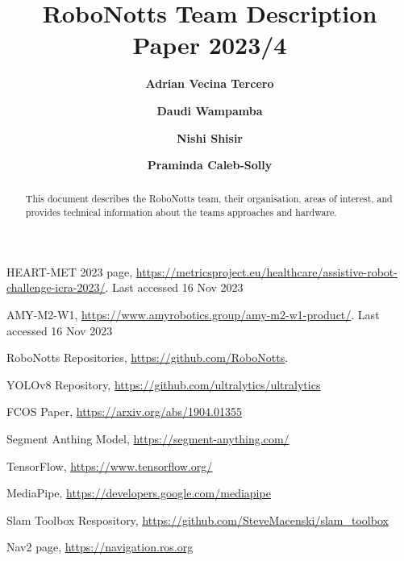 \documentclass[runningheads]{llncs}
\begin{document}
%
\title{RoboNotts Team Description Paper 2023/4}
%
%
\author{\textbf{Adrian Vecina Tercero}\and
\textbf{Daudi Wampamba}\and \textbf{Nishi Shisir} \and
\textbf{Praminda Caleb-Solly}}


%
%
%
\maketitle              %
%
\begin{abstract}
This document describes the RoboNotts team, their organisation, areas of interest, and provides technical information about the teams approaches and hardware.  
\end{abstract}
%
%
%




%
%
%
% 
% 
%
\begin{thebibliography}{8}

HEART-MET 2023 page, \url{https://metricsproject.eu/healthcare/assistive-robot-challenge-icra-2023/}. Last accessed 16
Nov 2023

AMY-M2-W1, \url{https://www.amyrobotics.group/amy-m2-w1-product/}. Last accessed 16
Nov 2023

RoboNotts Repositories, \url{https://github.com/RoboNotts}.

YOLOv8 Repository, \url{https://github.com/ultralytics/ultralytics}

FCOS Paper, \url{https://arxiv.org/abs/1904.01355}

Segment Anthing Model, \url{https://segment-anything.com/}

TensorFlow, \url{https://www.tensorflow.org/}

MediaPipe, \url{https://developers.google.com/mediapipe}

Slam Toolbox Respository, \url{https://github.com/SteveMacenski/slam\_toolbox}

Nav2 page, \url{https://navigation.ros.org}

\end{thebibliography}


\end{document}
